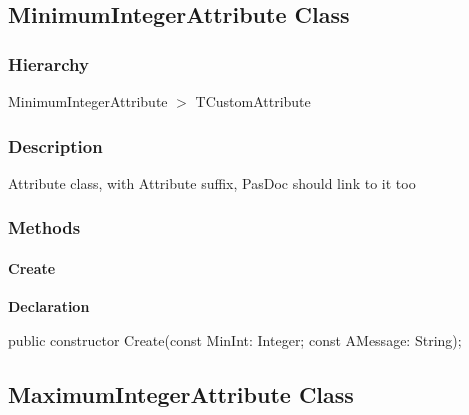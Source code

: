 \documentclass{report}
\newif\ifpdf
\begin{document}
\subsection*{MinimumIntegerAttribute Class}
\fi
\label{ok_attributes.MinimumIntegerAttribute}
\subsubsection*{\large{\textbf{Hierarchy}}\normalsize\hspace{1ex}\hfill}
MinimumIntegerAttribute {$>$} TCustomAttribute
\subsubsection*{\large{\textbf{Description}}\normalsize\hspace{1ex}\hfill}
Attribute class, with Attribute suffix, PasDoc should link to it too\subsubsection*{\large{\textbf{Methods}}\normalsize\hspace{1ex}\hfill}
\paragraph*{Create}\hspace*{\fill}

\label{ok_attributes.MinimumIntegerAttribute-Create}
\begin{list}{}{
\setlength{\itemindent}{0cm}
\setlength{\listparindent}{0cm}
\setlength{\leftmargin}{\evensidemargin}
\addtolength{\leftmargin}{\tmplength}
\settowidth{\labelsep}{X}
\addtolength{\leftmargin}{\labelsep}
\setlength{\labelwidth}{\tmplength}
}
\item[\textbf{Declaration}\hfill]
\ifpdf
\begin{flushleft}
\fi
\begin{ttfamily}
public constructor Create(const MinInt: Integer; const AMessage: String);\end{ttfamily}

\ifpdf
\end{flushleft}
\fi

\end{list}
\ifpdf
\subsection*{\large{\textbf{MaximumIntegerAttribute Class}}\normalsize\hspace{1ex}\hrulefill}
\else
\end{document}
